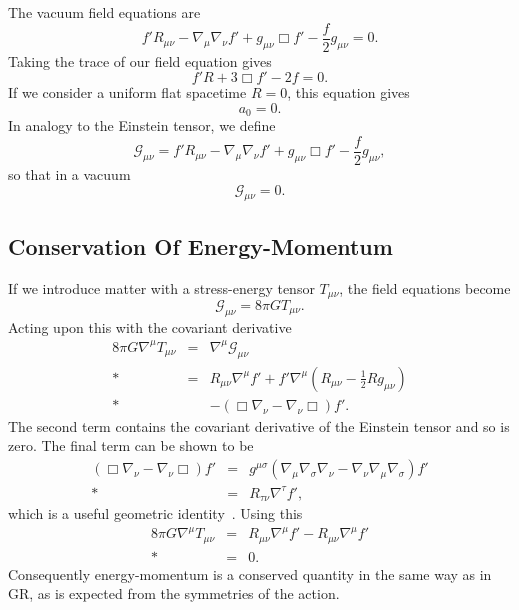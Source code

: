 \documentclass[aps,prd,amsfonts,amssymb,amsmath,nofootinbib,reprint,showpacs]{revtex4-1}
\newcommand{\recip}[1]{\ensuremath{\frac{1}{#1}}}
\begin{document}
The vacuum field equations are
\begin{equation}
f'R_{\mu\nu} - \nabla_\mu\nabla_\nu f' + g_{\mu\nu}\Box f' - \frac{f}{2}g_{\mu\nu} = 0.
\label{eq:Field_eq}
\end{equation}
Taking the trace of our field equation gives
\begin{equation}
f'R + 3\Box f' - 2f = 0.
\label{eq:Trace_eq}
\end{equation}
If we consider a uniform flat spacetime $R = 0$, this equation gives~\cite{Capozziello2007}
\begin{equation}
a_0 = 0.
\label{eq:a_0}
\end{equation}
In analogy to the Einstein tensor, we define
\begin{equation}
\mathcal{G}_{\mu\nu} = f'R_{\mu\nu} - \nabla_\mu\nabla_\nu f' + g_{\mu\nu}\Box f' - \frac{f}{2}g_{\mu\nu},
\label{eq:G_tensor}
\end{equation}
so that in a vacuum
\begin{equation}
\mathcal{G}_{\mu\nu} = 0.
\end{equation}

\subsection{Conservation Of Energy-Momentum}

If we introduce matter with a stress-energy tensor $T_{\mu\nu}$, the field equations become
\begin{equation}
\mathcal{G}_{\mu\nu} = 8\pi GT_{\mu\nu}.
\end{equation}
Acting upon this with the covariant derivative
\begin{eqnarray}
8\pi G\nabla^\mu T_{\mu\nu} & = & \nabla^\mu\mathcal{G}_{\mu\nu} \nonumber \\*
 & = & R_{\mu\nu}\nabla^\mu f' + f'\nabla^\mu\left(R_{\mu\nu} - \recip{2}R g_{\mu\nu}\right) \nonumber \\* 
 & & - \left(\Box\nabla_\nu - \nabla_\nu\Box\right)f'.
\end{eqnarray}
The second term contains the covariant derivative of the Einstein tensor and so is zero. The final term can be shown to be
\begin{eqnarray}
\left(\Box\nabla_\nu - \nabla_\nu\Box\right)f' & = & g^{\mu\sigma}\left(\nabla_\mu\nabla_\sigma\nabla_\nu - \nabla_\nu\nabla_\mu\nabla_\sigma\right)f' \nonumber \\*
 & = & R_{\tau\nu}\nabla^\tau f',
\end{eqnarray}
which is a useful geometric identity~\cite{Koivisto2006a}. Using this
\begin{eqnarray}
8\pi G\nabla^\mu T_{\mu\nu} & = & R_{\mu\nu}\nabla^\mu f' - R_{\mu\nu}\nabla^\mu f' \nonumber \\*
 & = & 0.
\end{eqnarray}
Consequently energy-momentum is a conserved quantity in the same way as in GR, as is expected from the symmetries of the action.
\end{document}
